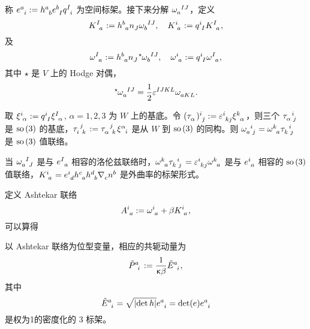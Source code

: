 		称 $\tensor{e}{^a_i} \definedby \tensor{h}{^a_b} \tensor{e}{^b_I} \tensor{q}{^I_i}$ 为空间标架。接下来分解 $\tensor{\omega}{_a^I^J}$，定义
		\begin{equation}
			\tensor{K}{^I_a} \definedby \tensor{h}{^b_a} \tensor{n}{_J} \tensor{\omega}{_b^I^J} \qc \tensor{K}{^i_a} \definedby \tensor{q}{^i_I} \tensor{K}{^I_a},
		\end{equation}
		及
		\begin{equation}
			\tensor{\omega}{^I_a} \definedby \tensor{h}{^b_a} \tensor{n}{_J} \tensor[^\star]{\omega}{_b^I^J} \qc \tensor{\omega}{^i_a} \definedby \tensor{q}{^i_I} \tensor{\omega}{^I_a},
		\end{equation}
		其中 $\star$ 是 $V$ 上的 Hodge 对偶，
		\begin{equation}
			\tensor[^\star]{\omega}{_a^I^J} = \frac{1}{2} \tensor{\vol}{^I^J^K^L} \tensor{\omega}{_a_K_L}.
		\end{equation}

		\begin{Remark}
			取 $\tensor{\xi}{^i_\alpha} := \tensor{q}{^i_I} \tensor{\xi}{^I_\alpha}$, $\alpha=1,2,3$ 为 $W$ 上的基底。令 $( \tensor{\tau}{_\alpha} )\tensor{{}}{^i_j} := \tensor{\vol}{^i_k_j} \tensor{\xi}{^k_\alpha}$，则三个 $\tensor{{\tau}}{_\alpha^i_j}$ 是 $\mathrm{so}\left( 3 \right)$ 的基底，$\tensor{\tau}{_i^j_k} := \tensor{\tau}{_\alpha^j_k} \tensor{\xi}{^\alpha_i}$ 是从 $W$ 到 $\mathrm{so}\left( 3 \right)$ 的同构。则 $\tensor{\omega}{_a^i_j} = \tensor{\omega}{^k_a} \tensor{\tau}{_k^i_j}$ 是 $\mathrm{so}\left( 3 \right)$ 值联络。
		\end{Remark}
		
		\begin{Property}
			当 $\tensor{\omega}{_a^I_J}$ 是与 $\tensor{e}{^I_a}$ 相容的洛伦兹联络时，$\tensor{\omega}{^k_a} \tensor{\tau}{_k^i_j} = \tensor{\vol}{^i_k_j}\tensor{\omega}{^k_a}$ 是与 $\tensor{e}{^i_a}$ 相容的 $\mathrm{so}\left( 3 \right)$ 值联络，$\tensor{K}{^i_a} = \tensor{e}{^i_d} \tensor{h}{^c_a} \tensor{h}{^d_b} \Nabla{c} \tensor{n}{^b}$ 是外曲率的标架形式。
		\end{Property}

		定义 Ashtekar 联络
		\begin{equation}
			\tensor{A}{^i_a} \definedby \tensor{\omega}{^i_a} + \beta \tensor{K}{^i_a},
		\end{equation}
		可以算得
		\begin{Property}
			以 Ashtekar 联络为位型变量，相应的共轭动量为
			\begin{equation}
				\tensor{\tilde{P}}{^a_i} \definedby \frac{1}{\gkappa \beta} \tensor{\tilde{E}}{^a_i},
			\end{equation}
			其中
			\begin{equation}
				\tensor{\tilde{E}}{^a_i} = \sqrt{\abs{\det h}} \tensor{e}{^a_i} = \det(e) \tensor{e}{^a_i}
			\end{equation}
			是权为1的密度化的 3 标架。
		\end{Property}

